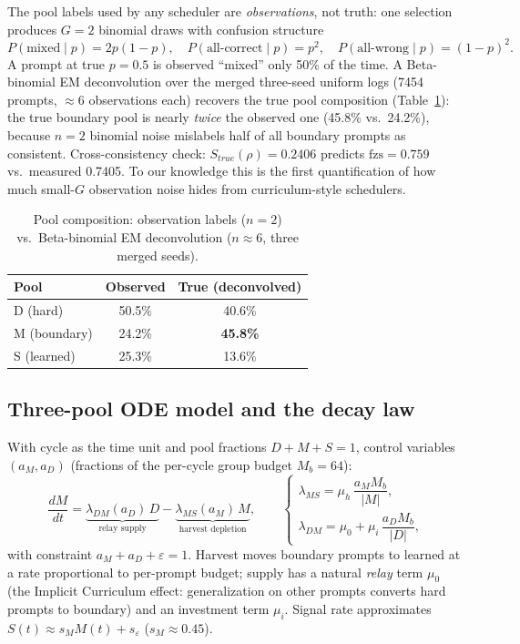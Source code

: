 \documentclass[11pt]{article}
\theoremstyle{definition}
\newcommand{\fzs}{\text{fzs}}
\begin{document}
The pool labels used by any scheduler are \emph{observations}, not truth: one
selection produces $G{=}2$ binomial draws with confusion structure
\begin{equation}\label{eq:confusion}
P(\text{mixed}\mid p)=2p(1-p),\quad
P(\text{all-correct}\mid p)=p^2,\quad
P(\text{all-wrong}\mid p)=(1-p)^2 .
\end{equation}
A prompt at true $p{=}0.5$ is observed ``mixed'' only 50\% of the time. A
Beta-binomial EM deconvolution over the merged three-seed uniform logs (7454
prompts, ${\approx}6$ observations each) recovers the true pool composition
(Table~\ref{tab:deconv}): the true boundary pool is nearly \emph{twice} the
observed one (45.8\% vs.\ 24.2\%), because $n{=}2$ binomial noise mislabels half
of all boundary prompts as consistent. Cross-consistency check:
$S_{true}(\rho){=}0.2406$ predicts $\fzs{=}0.759$ vs.\ measured 0.7405. To our
knowledge this is the first quantification of how much small-$G$ observation noise
hides from curriculum-style schedulers.

\begin{table}[t]
\centering\small
\caption{Pool composition: observation labels ($n{=}2$) vs.\ Beta-binomial EM
deconvolution ($n{\approx}6$, three merged seeds).}
\label{tab:deconv}
\begin{tabular}{@{}lcc@{}}
\toprule
Pool & Observed & True (deconvolved) \\
\midrule
D (hard) & 50.5\% & 40.6\% \\
M (boundary) & 24.2\% & \textbf{45.8\%} \\
S (learned) & 25.3\% & 13.6\% \\
\bottomrule
\end{tabular}
\end{table}

\subsection{Three-pool ODE model and the decay law}\label{sec:l3-ode}
With cycle as the time unit and pool fractions $D{+}M{+}S{=}1$, control variables
$(a_M,a_D)$ (fractions of the per-cycle group budget $M_b{=}64$):
\begin{equation}\label{eq:ode}
\frac{dM}{dt} = \underbrace{\lambda_{DM}(a_D)\,D}_{\text{relay supply}}
- \underbrace{\lambda_{MS}(a_M)\,M}_{\text{harvest depletion}},\qquad
\begin{cases}
\lambda_{MS} = \mu_h\,\dfrac{a_M M_b}{|M|},\\[1.2ex]
\lambda_{DM} = \mu_0 + \mu_i\,\dfrac{a_D M_b}{|D|},
\end{cases}
\end{equation}
with constraint $a_M+a_D+\varepsilon=1$. Harvest moves boundary prompts to
learned at a rate proportional to per-prompt budget; supply has a natural
\emph{relay} term $\mu_0$ (the Implicit Curriculum effect: generalization on other
prompts converts hard prompts to boundary) and an investment term $\mu_i$.
Signal rate approximates $S(t)\approx s_M M(t)+s_\varepsilon$ ($s_M\approx0.45$).
\end{document}

